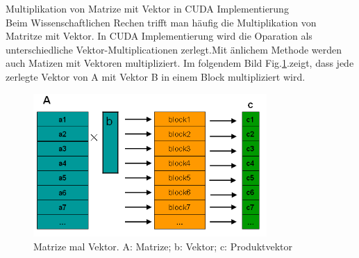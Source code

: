 Multiplikation von Matrize mit Vektor in CUDA Implementierung\\

Beim Wissenschaftlichen Rechen trifft man häufig die Multiplikation von Matritze mit Vektor. In CUDA Implementierung wird die Oparation als unterschiedliche Vektor-Multiplicationen zerlegt.Mit änlichem Methode werden auch Matizen mit Vektoren multipliziert. Im folgendem Bild Fig.\ref{MatrixVektor}.zeigt, dass jede zerlegte Vektor von A mit Vektor B in einem Block multipliziert wird. 

\begin{figure}[htbp]
\includegraphics[width=3.5in]{.//pic//MatrixVektor}
\caption{Matrize mal Vektor. A: Matrize; b: Vektor; c: Produktvektor}
\label{MatrixVektor} 
\end{figure}